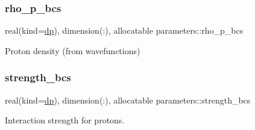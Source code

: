\subsubsection{\texorpdfstring{rho\+\_\+p\+\_\+bcs}{rho\_p\_bcs}}
{\footnotesize\ttfamily real(kind=\mbox{\hyperlink{namespaceparameters_a52f8c6351fd79345d8811e065bcbbb37}{dp}}), dimension(\+:), allocatable parameters\+::rho\+\_\+p\+\_\+bcs}



Proton density (from wavefunctions) 

\mbox{\label{group__PAIRING_ga94c22855af03bc8be5e687f4c8a80ee1}} 
\subsubsection{\texorpdfstring{strength\+\_\+bcs}{strength\_bcs}}
{\footnotesize\ttfamily real(kind=\mbox{\hyperlink{namespaceparameters_a52f8c6351fd79345d8811e065bcbbb37}{dp}}), dimension(\+:), allocatable parameters\+::strength\+\_\+bcs}



Interaction strength for protons. 

